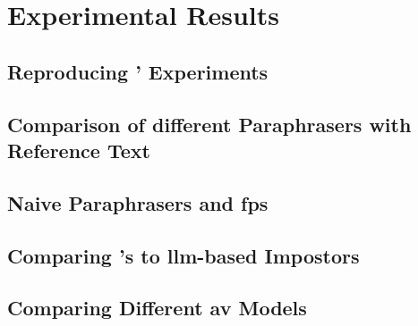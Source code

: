 \chapter{Experimental Results}
\label{chap:experimental_results}

\section{Reproducing \citet{koppel_determining_2014}' Experiments}



\section{Comparison of different Paraphrasers with Reference Text}



\section{Naive Paraphrasers and \acp{fp}}

\section{Comparing \citet{koppel_determining_2014}'s to \ac{llm}-based Impostors}

\section{Comparing Different \ac{av} Models}